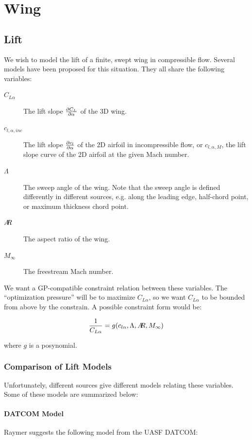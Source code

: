 \documentclass[12pt]{article}
\newcommand{\ar}{A\mkern-6mu R}
\begin{document}
\section{Wing}
\subsection{Lift}
We wish to model the lift of a finite, swept wing in compressible flow.
Several models have been proposed for this situation.
They all share the following variables:

\begin{description}
    \item[$C_{L\alpha}$] The lift slope $\pdv{C_L}{\alpha}$ of the 3D wing.
    \item[$c_{l, \alpha, inc}$] The lift slope $\pdv{c_l}{\alpha}$ of the 2D airfoil in incompressible flow, or $c_{l, \alpha, M}$, the lift slope curve of the 2D airfoil at the given Mach number.
    \item[$\Lambda$] The sweep angle of the wing. Note that the sweep angle is defined differently in different sources, e.g. along the leading edge, half-chord point, or maximum thickness chord point.
    \item[$\ar$] The aspect ratio of the wing.
    \item[$M_{\infty}$] The freestream Mach number.
\end{description}

We want a GP-compatible constraint relation between these variables. The ``optimization pressure'' will be to maximize $C_{L\alpha}$, so we want $C_{L\alpha}$ to be bounded from above by the constrain. A possible constraint form would be:

\begin{equation}
\frac{1}{C_{L\alpha}} = g(c_{l\alpha}, \Lambda, \ar, M_\infty)
\end{equation}

where $g$ is a posynomial.

\subsubsection{Comparison of Lift Models}

Unfortunately, different sources give different models relating these variables. Some of these models are summarized below:

\paragraph{DATCOM Model}
Raymer \cite{Raymer2012} suggests the following model from the UASF DATCOM:
\end{document}
